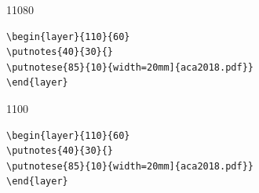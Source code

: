 \documentclass[dvipdfmx]{article}
\begin{document}
\begin{layer}{110}{80}
\end{layer}

\begin{verbatim}
\begin{layer}{110}{60}
\putnotes{40}{30}{}
\putnotese{85}{10}{width=20mm]{aca2018.pdf}} 
\end{layer}
\end{verbatim}

\newpage

\begin{layer}{110}{0}
\end{layer}

\begin{verbatim}
\begin{layer}{110}{60}
\putnotes{40}{30}{}
\putnotese{85}{10}{width=20mm]{aca2018.pdf}} 
\end{layer}
\end{verbatim}
\end{document}
